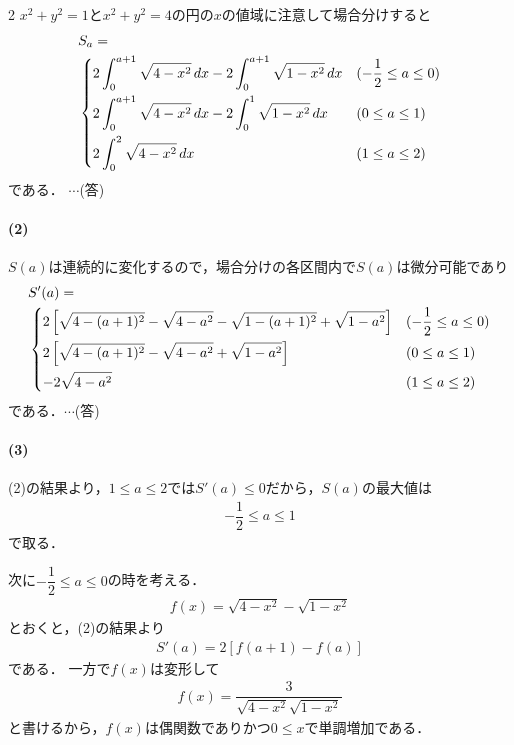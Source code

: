 \documentclass[../../main.tex]{subfiles}
\begin{document}
\begin{multicols}{2}
  $x^2+y^2=1$と$x^2+y^2=4$の円の$x$の値域に注意して場合分けすると
  \begin{align}
    & S_a =                                                                                              \\
    &
    \begin{dcases}
      2 \int_0^{a+1} \sqrt{4-x^2} \, dx - 2 \int_0^{a+1} \sqrt{1-x^2} \, dx & (-\dfrac{1}{2} \le a \le 0) \\
      2 \int_0^{a+1} \sqrt{4-x^2} \, dx - 2 \int_0^{1} \sqrt{1-x^2} \, dx   & (0 \le a \le 1)            \\
      2 \int_0^{2} \sqrt{4-x^2} \, dx                                       & (1 \le a \le 2)
    \end{dcases}
  \end{align}
  である．  $\cdots$(答)

  \paragraph{(2)}
  $S(a)$は連続的に変化するので，場合分けの各区間内で$S(a)$は微分可能であり
  \begin{align}
    & S'(a) =                                                                                                                                      \\
    &
    \begin{dcases}
      2\left[\sqrt{4-(a+1)^2} - \sqrt{4-a^2} - \sqrt{1-(a+1)^2} + \sqrt{1-a^2}\right] & (-\dfrac{1}{2} \le a \le 0) \\
      2\left[\sqrt{4-(a+1)^2} - \sqrt{4-a^2} + \sqrt{1-a^2}\right]                    & (0 \le a \le 1)            \\
      -2\sqrt{4-a^2}                                                                  & (1 \le a \le 2)
    \end{dcases}
  \end{align}
  である．$\cdots$(答)

  \paragraph{(3)}
  (2)の結果より，$1\le a \le 2$では$S'(a)\le 0$だから，$S(a)$の最大値は
  \begin{align}
    -\dfrac{1}{2} \le a \le 1
  \end{align}
  で取る．

  次に$-\dfrac{1}{2}\le a \le 0$の時を考える．
  \begin{align}
    f(x) = \sqrt{4-x^2} - \sqrt{1-x^2}
  \end{align}
  とおくと，(2)の結果より
  \begin{align}
    S'(a) = 2\left[f(a+1)-f(a)\right]
  \end{align}
  である．
  一方で$f(x)$は変形して
  \begin{align}
    f(x) = \dfrac{3}{\sqrt{4-x^2}\sqrt{1-x^2}}
  \end{align}
  と書けるから，$f(x)$は偶関数でありかつ$0 \le x$で単調増加である．


\end{multicols}
\end{document}
